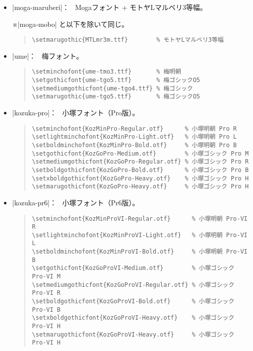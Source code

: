 \documentclass[uplatex,dvipdfmx,a4paper]{jsarticle}
\newcommand{\Note}{\par\noindent ※}
\newcommand{\Means}{：\ }
\begin{document}
\begin{itemize}
\item |moga-maruberi|\Means
   Mogaフォント + モトヤLマルベリ3等幅。
   \Note |moga-mobo| と以下を除いて同じ。
\begin{quote}\small\begin{verbatim}
\setmarugothic{MTLmr3m.ttf}        % モトヤLマルベリ3等幅
\end{verbatim}\end{quote}

\item |ume|\Means
   梅フォント。
\begin{quote}\small\begin{verbatim}
\setminchofont{ume-tmo3.ttf}       % 梅明朝
\setgothicfont{ume-tgo5.ttf}       % 梅ゴシックO5
\setmediumgothicfont{ume-tgo4.ttf} % 梅ゴシック
\setmarugothic{ume-tgo5.ttf}       % 梅ゴシックO5
\end{verbatim}\end{quote}

\item |kozuka-pro|\Means
  小塚フォント（Pro版）。
\begin{quote}\small\begin{verbatim}
\setminchofont{KozMinPro-Regular.otf}      % 小塚明朝 Pro R
\setlightminchofont{KozMinPro-Light.otf}   % 小塚明朝 Pro L
\setboldminchofont{KozMinPro-Bold.otf}     % 小塚明朝 Pro B
\setgothicfont{KozGoPro-Medium.otf}        % 小塚ゴシック Pro M
\setmediumgothicfont{KozGoPro-Regular.otf} % 小塚ゴシック Pro R
\setboldgothicfont{KozGoPro-Bold.otf}      % 小塚ゴシック Pro B
\setxboldgothicfont{KozGoPro-Heavy.otf}    % 小塚ゴシック Pro H
\setmarugothicfont{KozGoPro-Heavy.otf}     % 小塚ゴシック Pro H
\end{verbatim}\end{quote}

\item |kozuka-pr6|\Means
  小塚フォント（Pr6版）。
\begin{quote}\small\begin{verbatim}
\setminchofont{KozMinProVI-Regular.otf}      % 小塚明朝 Pro-VI R
\setlightminchofont{KozMinProVI-Light.otf}   % 小塚明朝 Pro-VI L
\setboldminchofont{KozMinProVI-Bold.otf}     % 小塚明朝 Pro-VI B
\setgothicfont{KozGoProVI-Medium.otf}        % 小塚ゴシック Pro-VI M
\setmediumgothicfont{KozGoProVI-Regular.otf} % 小塚ゴシック Pro-VI R
\setboldgothicfont{KozGoProVI-Bold.otf}      % 小塚ゴシック Pro-VI B
\setxboldgothicfont{KozGoProVI-Heavy.otf}    % 小塚ゴシック Pro-VI H
\setmarugothicfont{KozGoProVI-Heavy.otf}     % 小塚ゴシック Pro-VI H
\end{verbatim}\end{quote}


\end{itemize}
\end{document}
